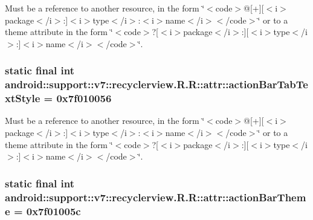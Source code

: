 Must be a reference to another resource, in the form \char`\"{}$<$code$>$@\mbox{[}+\mbox{]}\mbox{[}$<$i$>$package$<$/i$>$:\mbox{]}$<$i$>$type$<$/i$>$:$<$i$>$name$<$/i$>$$<$/code$>$\char`\"{} or to a theme attribute in the form \char`\"{}$<$code$>$?\mbox{[}$<$i$>$package$<$/i$>$:\mbox{]}\mbox{[}$<$i$>$type$<$/i$>$:\mbox{]}$<$i$>$name$<$/i$>$$<$/code$>$\char`\"{}. \hypertarget{classandroid_1_1support_1_1v7_1_1recyclerview_1_1_r_1_1attr_66af78d60997ce5b686fc3b4a2f2f84c}{
\subsubsection[{actionBarTabTextStyle}]{\setlength{\rightskip}{0pt plus 5cm}static final int android::support::v7::recyclerview.R.R::attr::actionBarTabTextStyle = 0x7f010056}}
\label{classandroid_1_1support_1_1v7_1_1recyclerview_1_1_r_1_1attr_66af78d60997ce5b686fc3b4a2f2f84c}


Must be a reference to another resource, in the form \char`\"{}$<$code$>$@\mbox{[}+\mbox{]}\mbox{[}$<$i$>$package$<$/i$>$:\mbox{]}$<$i$>$type$<$/i$>$:$<$i$>$name$<$/i$>$$<$/code$>$\char`\"{} or to a theme attribute in the form \char`\"{}$<$code$>$?\mbox{[}$<$i$>$package$<$/i$>$:\mbox{]}\mbox{[}$<$i$>$type$<$/i$>$:\mbox{]}$<$i$>$name$<$/i$>$$<$/code$>$\char`\"{}. \hypertarget{classandroid_1_1support_1_1v7_1_1recyclerview_1_1_r_1_1attr_7acb2903babd541e6919c6beaed72325}{
\subsubsection[{actionBarTheme}]{\setlength{\rightskip}{0pt plus 5cm}static final int android::support::v7::recyclerview.R.R::attr::actionBarTheme = 0x7f01005c}}
\label{classandroid_1_1support_1_1v7_1_1recyclerview_1_1_r_1_1attr_7acb2903babd541e6919c6beaed72325}


